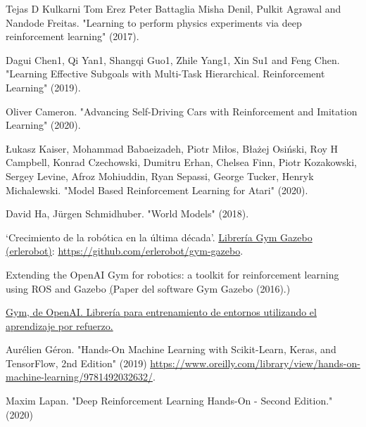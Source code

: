 \begin{thebibliography}{69}
 Tejas D Kulkarni Tom Erez Peter Battaglia Misha Denil, Pulkit Agrawal and Nandode Freitas. "Learning to 
perform physics experiments via deep reinforcement learning" (2017).

 Dagui Chen1, Qi Yan1, Shangqi Guo1, Zhile Yang1, Xin Su1 and Feng Chen. "Learning Effective Subgoals with Multi-Task Hierarchical. Reinforcement Learning" (2019).

 Oliver Cameron. "Advancing Self-Driving Cars with Reinforcement and Imitation Learning" (2020).

 Łukasz Kaiser, Mohammad Babaeizadeh, Piotr Miłos, Błażej Osiński, Roy H Campbell, Konrad Czechowski, Dumitru Erhan, Chelsea Finn, Piotr Kozakowski, Sergey Levine, Afroz Mohiuddin, Ryan Sepassi, George Tucker, Henryk Michalewski. "Model Based Reinforcement Learning for Atari" (2020).

 David Ha, Jürgen Schmidhuber. "World Models" (2018).

 `Crecimiento de la robótica en la última década'. \href{https://www.interempresas.net/Robotica/Articulos/254914-Crece-un-6-por-ciento-el-numero-de-robots-industriales-instalados-en-todo-el-mundo-en-2018.html}

 \href{https://github.com/erlerobot/gym-gazebo}{Librería Gym Gazebo (erlerobot)}: \url{https://github.com/erlerobot/gym-gazebo}.

 Extending the OpenAI Gym for robotics: a toolkit for reinforcement learning using ROS and Gazebo \href{https://arxiv.org/pdf/1608.05742.pdf}(Paper del software Gym Gazebo (2016).)

 \href{https://gym.openai.com/}{Gym, de OpenAI. Librería para entrenamiento de entornos utilizando el aprendizaje por refuerzo.}

 Aurélien Géron. "Hands-On Machine Learning with Scikit-Learn, Keras, and TensorFlow, 2nd Edition" (2019) \url{https://www.oreilly.com/library/view/hands-on-machine-learning/9781492032632/}.

 Maxim Lapan. "Deep Reinforcement Learning Hands-On - Second Edition." (2020) 

\end{thebibliography}
